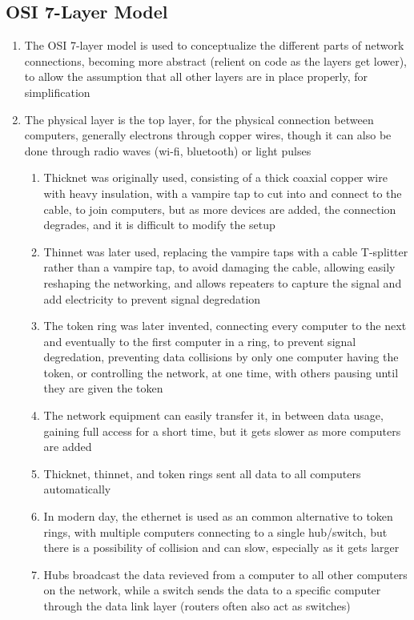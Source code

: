 \documentclass[11 pt, twoside]{article}
\begin{document}
\subsection{OSI 7-Layer Model}
\begin{enumerate}
\item The OSI 7-layer model is used to conceptualize the different parts of network connections, becoming more abstract (relient on code as the layers get lower), to allow the assumption that all other layers are in place properly, for simplification
\item The physical layer is the top layer, for the physical connection between computers, generally electrons through copper wires, though it can also be done through radio waves (wi-fi, bluetooth) or light pulses
\begin{enumerate}
\item Thicknet was originally used, consisting of a thick coaxial copper wire with heavy insulation, with a vampire tap to cut into and connect to the cable, to join computers, but as more devices are added, the connection degrades, and it is difficult to modify the setup
\item Thinnet was later used, replacing the vampire taps with a cable T-splitter rather than a vampire tap, to avoid damaging the cable, allowing easily reshaping the networking, and allows repeaters to capture the signal and add electricity to prevent signal degredation
\item The token ring was later invented, connecting every computer to the next and eventually to the first computer in a ring, to prevent signal degredation, preventing data collisions by only one computer having the token, or controlling the network, at one time, with others pausing until they are given the token
\item The network equipment can easily transfer it, in between data usage, gaining full access for a short time, but it gets slower as more computers are added
\item Thicknet, thinnet, and token rings sent all data to all computers automatically
\item In modern day, the ethernet is used as an common alternative to token rings, with multiple computers connecting to a single hub/switch, but there is a possibility of collision and can slow, especially as it gets larger
\item Hubs broadcast the data revieved from a computer to all other computers on the network, while a switch sends the data to a specific computer through the data link layer (routers often also act as switches)

\end{enumerate}
\end{enumerate}
\end{document}
